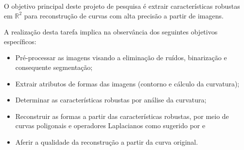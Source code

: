 \documentclass[
	12pt,				%
	oneside,			%
	a4paper,			%
	sumario=tradicional,
	english,			%
	french,				%
	spanish,			%
	brazil,				%
]{abntex2}
\begin{document}
O objetivo principal deste projeto de pesquisa é extrair características robustas em $\mathbb{R}^2$ para reconstrução de curvas com alta precisão a partir de imagens. 

A realização desta tarefa implica na observância dos seguintes objetivos específicos:

\begin{itemize}
    \item Pré-processar as imagens visando a eliminação de ruídos,  binarização e consequente segmentação;
    \item Extrair atributos de formas das imagens (contorno e cálculo da curvatura);
    \item Determinar as características robustas por análise da curvatura;
    \item Reconstruir as formas a partir das características robustas, por meio de curvas poligonais e operadores Laplacianos como sugerido por  e 
    \item Aferir a qualidade da reconstrução a partir da curva original.
\end{itemize}





 
\end{document}
